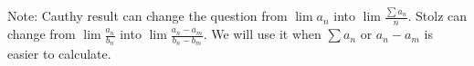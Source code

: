 Note: Cauthy result can change the question from $\lim a_n$ into $\lim \frac{\sum a_n}{n}$. Stolz can change from $\lim \frac{a_n}{b_n}$ into $\lim \frac{a_n - a_m}{b_n - b_m}$. We will use it when $\sum a_n$ or $a_n - a_m$ is easier to calculate.
















































































































